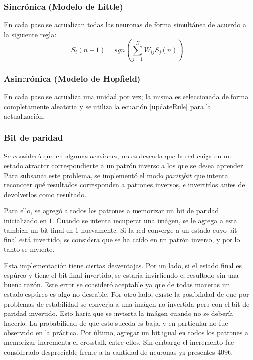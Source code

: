 \documentclass[%
    final,
    reprint,
    notitlepage,
    narroweqnarray,
    inline,
    twoside,
    invited
    ]{ieee}
\begin{document}
\subsubsection{Sincrónica (Modelo de Little)}

\par En cada paso se actualizan todas las neuronas de forma simultánea de acuerdo a la siguiente regla:\\

\begin{equation}
\label{updateRule}
S_i(n+1) = sgn\left(\sum_{j=1}^{N}{W_{ij}S_j(n)}\right)
\end{equation}

\subsubsection{Asincrónica (Modelo de Hopfield)}

\par En cada paso se actualiza una unidad por vez; la misma es seleccionada de forma completamente aleatoria y se utiliza la ecuación \ref{updateRule} para la actualización.

\subsubsection{Bit de paridad}

\par Se consideró que en algunas ocasiones, no es deseado que la red caiga en un estado atractor correspondiente a un patrón inverso a 
los que se desea aprender. Para subsanar este problema, se implementó el modo $paritybit$ que intenta 
reconocer qué resultados corresponden a patrones inversos, e invertirlos antes de devolverlos 
como resultado.

\par Para ello, se agregó a todos los patrones a memorizar un bit de paridad inicializado en $1$. Cuando 
se intenta recuperar una imágen, se le agrega a esta también un bit final en $1$ nuevamente. Si la red 
converge a un estado cuyo bit final está invertido, se considera que se ha caído en un patrón inverso, 
y por lo tanto se invierte.

\par Esta implementación tiene ciertas desventajas. Por un lado, si el estado final es espúreo y tiene 
 el bit final invertido, se estaría invirtiendo el resultado sin una buena razón. Este error se consideró 
aceptable ya que de todas maneras un estado espúreo es algo no deseable. Por otro lado, existe la posibilidad 
de que por problemas de estabilidad se converja a una imágen no invertida pero con el bit de paridad 
invertido. Esto haría que se invierta la imágen cuando no se debería hacerlo. La probabilidad de que 
esto suceda es baja, y en particular no fue observado en la práctica. Por último, agregar un bit igual 
en todos los patrones a memorizar incrementa el crosstalk entre ellos. Sin embargo el incremento fue 
considerado despreciable frente a la cantidad de neuronas ya presentes $4096$.
\end{document}
